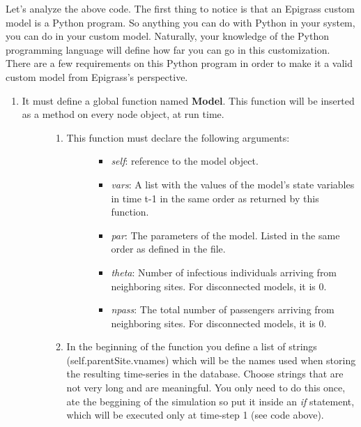\documentclass[a4paper,10pt]{manual}
\begin{document}
Let's analyze the above code. The first thing to notice is that an Epigrass custom model is a Python program. So anything you can do with Python in your system, you can do in your custom model. Naturally, your knowledge of the Python programming language will define how far you can go in this customization. There are a few requirements on this Python program in order to make it a valid custom model from Epigrass's perspective.
\begin{enumerate}
\item {} \begin{description}
\item[It must define a global function named \textbf{Model}. This function will be inserted as a method on every node object, at run time.]\begin{enumerate}
\item {} \begin{description}
\item[This function must declare the following arguments:]\begin{itemize}
\item {} 
\emph{self}: reference to the model object.

\item {} 
\emph{vars}: A list with the values of the model's state variables in time t-1 in the same order as returned by this function.

\item {} 
\emph{par}: The parameters of the model. Listed in the same order as defined in the  file.

\item {} 
\emph{theta}: Number of infectious individuals arriving from neighboring sites. For disconnected models, it is 0.

\item {} 
\emph{npass}: The total number of passengers arriving from neighboring sites. For disconnected models, it is 0.

\end{itemize}

\end{description}

\item {} 
In the beginning of the function you define a list of strings (self.parentSite.vnames) which will be the names used when storing the resulting time-series in the database. Choose strings that are not very long and are meaningful. You only need to do this once, ate the beggining of the simulation so put it inside an \emph{if} statement, which will be executed only at time-step 1 (see code above).


\end{enumerate}
\end{description}
\end{enumerate}
\end{document}
